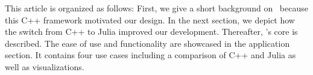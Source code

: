This article is organized as follows: First, we give a short background on \ball\ because this C++ framework motivated our design. In the next section, we depict how the switch from C++ to Julia improved our development. Thereafter, \biochem's core is described. The ease of use and functionality are showcased in the application section. It contains four use cases including a comparison of C++ and Julia as well as visualizations. 